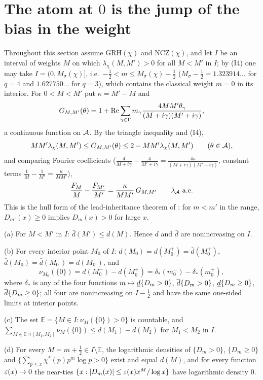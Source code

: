 \section{The atom at \texorpdfstring{$0$}{0} is the jump of the bias in the weight}\label{sec:jump}

Throughout this section assume GRH$(\chi)$ and NCZ$(\chi)$, and let $I$ be an interval of weights $M$ on which $\lambda_\chi(M,M')>0$ for all $M<M'$ in $I$; by (I4) one may take $I=(0,M_\sigma(\chi)]$, i.e.\ $-\frac12<m\le M_\sigma(\chi)-\frac12$ ($M_\sigma-\frac12=1.323914\ldots$ for $q=4$ and $1.627750\ldots$ for $q=3$), which contains the classical weight $m=0$ in its interior. For $0<M<M'$ put $\kappa=M'-M$ and
\[
G_{M,M'}(\theta)=1+\operatorname{Re}\sum_{\gamma\in\Gamma}m_\gamma\frac{4MM'\theta_\gamma}{(M+i\gamma)(M'+i\gamma)},
\]
a continuous function on $\mathcal A$. By the triangle inequality and (I4),
\begin{equation}\label{eq:Gbounds}
MM'\lambda_\chi(M,M')\le G_{M,M'}(\theta)\le2-MM'\lambda_\chi(M,M')\qquad(\theta\in\mathcal A),
\end{equation}
and comparing Fourier coefficients ($\frac4{M+i\gamma}-\frac4{M'+i\gamma}=\frac{4\kappa}{(M+i\gamma)(M'+i\gamma)}$, constant terms $\frac1M-\frac1{M'}=\frac\kappa{MM'}$),
\begin{equation}\label{eq:transversal}
\frac{F_M}M-\frac{F_{M'}}{M'}=\frac\kappa{MM'}\,G_{M,M'}\qquad\lambda_{\mathcal A}\text{-a.e.}
\end{equation}
This is the hull form of the lead-inheritance theorem of \cite{MC}: for $m<m'$ in the range, $D_{m'}(x)\ge0$ implies $D_m(x)>0$ for large $x$.

\begin{theorem}\label{thm:jump}
\textup{(a)} For $M<M'$ in $I$: $\bar d(M')\le d(M)$. Hence $d$ and $\bar d$ are nonincreasing on $I$.

\textup{(b)} For every interior point $M_0$ of $I$: $d(M_0)=d(M_0^+)=\bar d(M_0^+)$, $\bar d(M_0)=\bar d(M_0^-)=d(M_0^-)$, and
\[
\nu_{M_0}(\{0\})=d(M_0^-)-d(M_0^+)=\delta_*(m_0^-)-\delta_*(m_0^+),
\]
where $\delta_*$ is any of the four functions $m\mapsto\underline d\{D_m>0\}$, $\overline d\{D_m>0\}$, $\underline d\{D_m\ge0\}$, $\overline d\{D_m\ge0\}$; all four are nonincreasing on $I-\frac12$ and have the same one-sided limits at interior points.

\textup{(c)} The set $\mathbb E=\{M\in I:\nu_M(\{0\})>0\}$ is countable, and $\sum_{M\in\mathbb E\cap[M_1,M_2]}\nu_M(\{0\})\le\bar d(M_1)-d(M_2)$ for $M_1<M_2$ in $I$.

\textup{(d)} For every $M=m+\frac12\in I\setminus\mathbb E$, the logarithmic densities of $\{D_m>0\}$, $\{D_m\ge0\}$ and $\{\sum_{p\le x}\chi^*(p)p^m\log p>0\}$ exist and equal $d(M)$, and for every function $\varepsilon(x)\to0$ the near-ties $\{x:|D_m(x)|\le\varepsilon(x)x^M/\log x\}$ have logarithmic density $0$.
\end{theorem}


